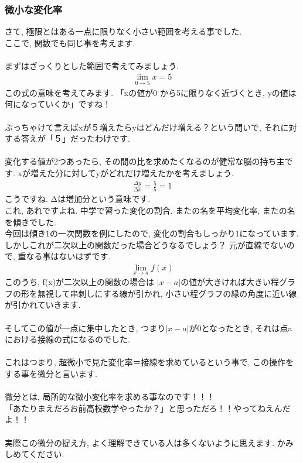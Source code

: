 \documentclass[11pt,a4paper]{jsarticle}
\begin{document}
\subsubsection{微小な変化率}
さて, 極限とはある一点に限りなく小さい範囲を考える事でした.\\
ここで, 関数でも同じ事を考えます.\\
\\
まずはざっくりとした範囲で考えてみましょう.\\
\begin{eqnarray}
\lim_{0\to5} x = 5
\end{eqnarray}
この式の意味を考えてみます. 「xの値が0 から5に限りなく近づくとき, yの値は何になっていくか」ですね！\\
\\
ぶっちゃけて言えばxが５増えたらyはどんだけ増える？という問いで, それに対する答えが「５」だったわけです.\\
\\
変化する値が2つあったら, その間の比を求めたくなるのが健常な脳の持ち主です. xが増えた分に対してyがどれだけ増えたかを考えましょう.
\begin{eqnarray}
\frac{\Delta y}{\Delta x} = \frac{5}{5} = 1
\end{eqnarray}
こうですね. Δは増加分という意味です.\\
これ, あれですよね. 中学で習った変化の割合, またの名を平均変化率, またの名を傾きでした.\\
今回は傾き1の一次関数を例にしたので, 変化の割合もしっかり1になっています.\\
しかしこれが二次以上の関数だった場合どうなるでしょう？ 元が直線でないので, 重なる事はないはずです.\\
\begin{eqnarray}
\lim_{x \to a} f(x)
\end{eqnarray}
このうち, f(x)が二次以上の関数の場合は $|x-a|$の値が大きければ大きい程グラフの形を無視して串刺しにする線が引かれ, 小さい程グラフの縁の角度に近い線が引かれていきます.\\
\\
そしてこの値が一点に集中したとき, つまり$|x-a|$が0となったとき, それは点aにおける接線の式になるのでした.\\
\\
これはつまり, 超微小で見た変化率＝接線を求めているという事で, この操作をする事を微分と言います.\\
\\
微分とは, 局所的な微小変化率を求める事なのです！！！\\
「あたりまえだろお前高校数学やったか？」と思っただろ！！やってねえんだよ！！\\
\\
実際この微分の捉え方, よく理解できている人は多くないように思えます. かみしめてください.
\end{document}
